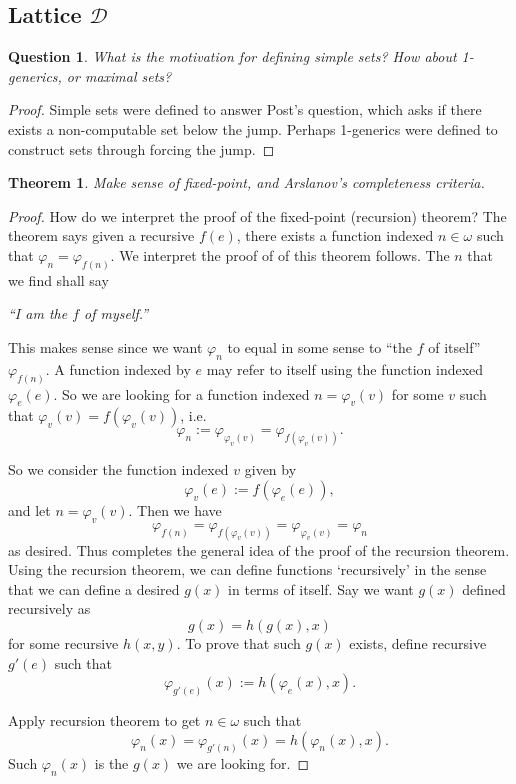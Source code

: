 \documentclass{article}
\newtheorem{theorem}{Theorem}[subsection]
\newtheorem{question}{Question}[subsection]
\begin{document}
  \subsection{Lattice $\mathcal{D}$}
    \begin{question}
      What is the motivation for defining simple sets? How about
      1-generics, or maximal sets?
    \end{question}
    \begin{proof}
      Simple sets were defined to answer Post's question, which asks if
      there exists a non-computable set below the jump. Perhaps 1-generics
      were defined to construct sets through forcing the jump.
    \end{proof}

    \begin{theorem}
      Make sense of fixed-point, and Arslanov's completeness criteria.
    \end{theorem}
    \begin{proof}
      How do we interpret the proof of the fixed-point (recursion) theorem?
      The theorem says given a recursive $f(e)$, there exists a function
      indexed $n\in\omega$ such that $\varphi_n=\varphi_{f(n)}$. We interpret
      the proof of of this theorem follows. The $n$ that we find shall say
      \begin{center}
        \textit{``I am the $f$ of myself.''}
      \end{center}

      This makes sense since we want $\varphi_n$ to equal in some sense to
      ``the $f$ of itself'' $\varphi_{f(n)}$. A function indexed by $e$ may
      refer to itself using the function indexed $\varphi_e(e)$. So we are
      looking for a function indexed $n=\varphi_v(v)$ for some $v$ such
      that
      $\varphi_v(v)=f(\varphi_v(v))$, i.e.
      \[\varphi_n :=\varphi_{\varphi_v(v)} =\varphi_{f(\varphi_v(v))}.\]

      So we consider the function indexed $v$ given by
      \[\varphi_v(e) :=f(\varphi_e(e)),\]
      and let $n=\varphi_v(v)$. Then we have
      \[\varphi_{f(n)} =\varphi_{f(\varphi_v(v))} =\varphi_{\varphi_v(v)}
      =\varphi_n\]
      as desired. Thus completes the general idea of the proof of the
      recursion theorem. \\

      Using the recursion theorem, we can define functions `recursively' in
      the sense that we can define a desired $g(x)$ in terms of itself. Say
      we want $g(x)$ defined recursively as
      \[g(x)=h(g(x),x)\]
      for some recursive $h(x,y)$. To prove that such $g(x)$ exists,
      define recursive $g'(e)$ such that
      \[\varphi_{g'(e)}(x) :=h(\varphi_e(x),x).\]

      Apply recursion theorem to get $n\in\omega$ such that
      \[\varphi_n(x) =\varphi_{g'(n)}(x) =h(\varphi_n(x),x).\]
      Such $\varphi_n(x)$ is the $g(x)$ we are looking for.
    \end{proof}
\end{document}
